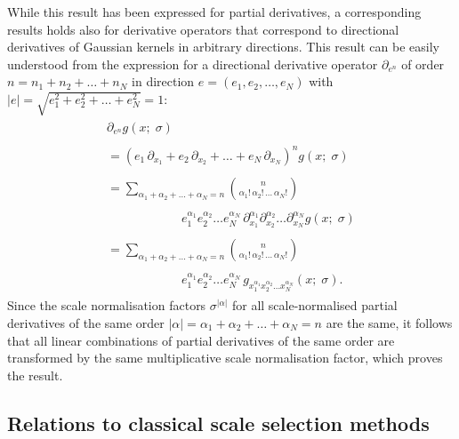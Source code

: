 \documentclass[twocolumn,runningheads]{svjour3}
\begin{document}
While this result has been expressed for partial derivatives, a
corresponding results holds also for derivative operators that
correspond to directional derivatives of Gaussian kernels in arbitrary
directions.
This result can be easily understood from the expression for a
directional derivative operator $\partial_{e^n}$ of order 
$n = n_1 + n_2 + \dots + n_N$ 
in direction $e = (e_1, e_2, \dots, e_N)$ with 
$|e| = \sqrt{e_1^2 + e_2^2 + \dots + e_N^2} = 1$:
\begin{align}
\begin{split}
\partial_{e^n} g(x;\; \sigma) 
\end{split}\nonumber\\
\begin{split}
= (e_1 \, \partial_{x_1} + e_2 \, \partial_{x_2} + \dots +  e_{N} \, \partial_{x_N})^n g(x;\; \sigma)
\end{split}\nonumber\\
\begin{split}
= \sum_{\alpha_1 + \alpha_2 + \dots + \alpha_N = n}
{n \choose \alpha_1! \, \alpha_2! \, \dots \, \alpha_N!} 
\end{split}\nonumber\\
\begin{split}
\quad\quad\quad\quad\quad\quad
e_1^{\alpha_1} e_2^{\alpha_2} \dots e_N^{\alpha_N} \,
\partial_{x_1}^{\alpha_1} \partial_{x_2}^{\alpha_2} \dots \partial_{x_N}^{\alpha_N} 
g(x;\; \sigma)
\end{split}\nonumber\\
\begin{split}
= \sum_{\alpha_1 + \alpha_2 + \dots + \alpha_N = n}
{n \choose \alpha_1! \, \alpha_2! \, \dots \, \alpha_N!} 
\end{split}\nonumber\\
\begin{split}
\quad\quad\quad\quad\quad\quad
e_1^{\alpha_1} e_2^{\alpha_2} \dots e_N^{\alpha_N} \,
g_{x_1^{\alpha_1} x_2^{\alpha_2} \dots x_N^{\alpha_N}}(x;\; \sigma).
\end{split}
\end{align}
Since the scale normalisation factors $\sigma^{|\alpha|}$
for all scale-normal\-ised partial derivatives
of the same order $|\alpha| = \alpha_1 + \alpha_2 + \dots + \alpha_N = n$ are the same, it follows that all linear
combinations of partial derivatives of the same order are 
transformed by the same multiplicative scale normalisation factor, which
proves the result.

\subsection{Relations to classical scale selection methods}
\end{document}
